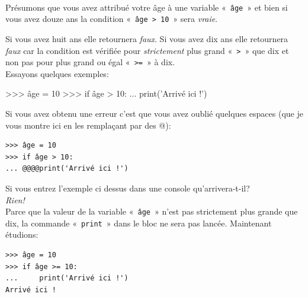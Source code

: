 \\


Présumons que vous avez attribué votre âge à une variable « \texttt{âge} »  et bien si vous avez douze ans la condition « \texttt{âge > 10} » sera \emph{vraie}.

Si vous avez huit ans elle retournera \emph{faux}.
Si vous avez dix ans elle retournera \emph{faux} car la condition est vérifiée pour \emph{strictement} plus grand « \texttt{>} »  que dix et non pas pour plus grand ou égal « \texttt{>=} » à dix.\\

Essayons quelques exemples:

\begin{Verbatim*}[frame=single,rulecolor=\color{green}, label=à taper avec attention]
>>> âge = 10
>>> if âge > 10:
...     print('Arrivé ici !')
\end{Verbatim*}

Si vous avez obtenu une erreur c'est que vous avez oublié quelques espaces (que je vous montre ici en les remplaçant par des @):

\begin{Verbatim}[frame=single,rulecolor=\color{gray}, label=ne pas saisir]
>>> âge = 10
>>> if âge > 10:
... @@@@print('Arrivé ici !')
\end{Verbatim}

Si vous entrez l'exemple ci dessus dans une console qu'arrivera-t-il?\\

\emph{Rien!}\\

Parce que la valeur de la variable « \texttt{âge} » n'est pas strictement plus grande que dix, la commande « \texttt{print} » dans le bloc ne sera pas lancée. Maintenant étudions:

\begin{Verbatim}[frame=single,rulecolor=\color{green}, label=à taper avec attention]
>>> âge = 10
>>> if âge >= 10:
...     print('Arrivé ici !')
Arrivé ici !
\end{Verbatim}

